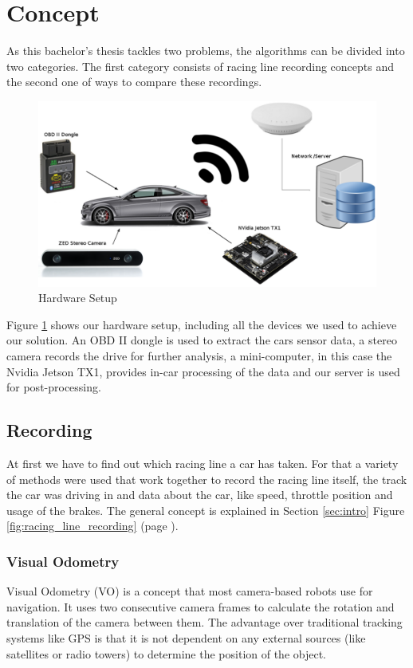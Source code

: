 \section{Concept}
\label{sec:algorithm}
\graphicspath{{utils/}}
As this bachelor's thesis tackles two problems, the algorithms can be divided into two categories.
The first category consists of racing line recording concepts and the second one of ways to compare these recordings.

\begin{figure}[!ht]
\centering
\includegraphics[width=\textwidth]{hw_setup}
\caption{Hardware Setup}
\label{fig:hw_setup}
\end{figure}

Figure \ref{fig:hw_setup} shows our hardware setup, including all the devices we used to achieve our solution. An OBD II dongle is used to extract the cars sensor data, a stereo camera records the drive for further analysis, a mini-computer, in this case the Nvidia Jetson TX1, provides in-car processing of the data and our server is used for post-processing.
\clearpage
\subsection{Recording}
At first we have to find out which racing line a car has taken. For that a variety of methods were used that work together to record the racing line itself, the track the car was driving in and data about the car, like speed, throttle position and usage of the brakes. The general concept is explained in Section \ref{sec:intro} Figure \ref{fig:racing_line_recording} (page \pageref{fig:racing_line_recording}).

\subsubsection{Visual Odometry}
\label{subsec:vo}
Visual Odometry (VO) is a concept that most camera-based robots use for navigation. It uses two consecutive camera frames to calculate the rotation and translation of the camera between them. The advantage over traditional tracking systems like GPS is that it is not dependent on any external sources (like satellites or radio towers) to determine the position of the object.

